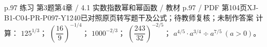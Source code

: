 \par\noindent\begin{minipage}{\linewidth}
\begin{bankitem}{p.97 练习 第3题}{第4章 / 4.1 实数指数幂和幂函数 / 教材 p.97 / PDF 第104页}{XJ-B1-C04-PR-P097-Y1240}{已对照原页转写题干及公式；待教师复核；未制作答案}
计算：
$125^{1/3}$；
$\left(\dfrac{16}9\right)^{-1/4}$；
$1000^{-2/3}$；
$\left(\dfrac{243}{32}\right)^{-2/5}$；
$a^{4/5}\cdot a^{3/4}\div a^{7/5}\ (a>0)$。
\end{bankitem}
\end{minipage}\par\medskip
